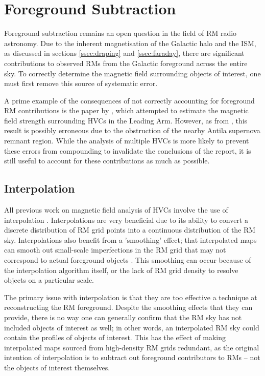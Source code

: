 \chapter{Foreground Subtraction}
\label{cha:FR}

Foreground subtraction remains an open question in the field of RM radio astronomy. Due to the inherent magnetisation of the Galactic halo and the ISM, as discussed in sections \ref{ssec:draping} and \ref{ssec:faraday}, there are significant contributions to observed RMs from the Galactic foreground across the entire sky. To correctly determine the magnetic field surrounding objects of interest, one must first remove this source of systematic error.


A prime example of the consequences of not correctly accounting for foreground RM contributions is the paper by \cite{ID3}, which attempted to estimate the magnetic field strength surrounding HVCs in the Leading Arm. However, as from \cite{ID36}, this result is possibly erroneous due to the obstruction of the nearby Antila supernova remnant region. While the analysis of multiple HVCs is more likely to prevent these errors from compounding to invalidate the conclusions of the report, it is still useful to account for these contributions as much as possible.

\section{Interpolation}
\label{sec:intp}

All previous work on magnetic field analysis of HVCs involve the use of interpolation \citep{ID3, ID5, ID6, ID26}. Interpolations are very beneficial due to its ability to convert a discrete distribution of RM grid points into a continuous distribution of the RM sky. Interpolations also benefit from a 'smoothing' effect; that interpolated maps can smooth out small-scale imperfections in the RM grid that may not correspond to actual foreground objects \citep{ID44, ID45, ID58}. This smoothing can occur because of the interpolation algorithm itself, or the lack of RM grid density to resolve objects on a particular scale.


The primary issue with interpolation is that they are too effective a technique at reconstructing the RM foreground. Despite the smoothing effects that they can provide, there is no way one can generally confirm that the RM sky has not included objects of interest as well; in other words, an interpolated RM sky could contain the profiles of objects of interest. This has the effect of making interpolated maps sourced from high-density RM grids redundant, as the original intention of interpolation is to subtract out foreground contributors to RMs – not the objects of interest themselves.


